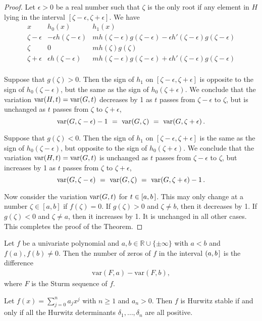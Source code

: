 \begin{proof}
 Let $\epsilon>0$ be a real number such that $\zeta$ is the only root if any element in $H$ lying in the interval
 $[\zeta-\epsilon,\zeta+\epsilon]$.
 We have
 \[
 \begin{array}{c|c|l}
   x & h_0(x) & h_1(x)\\\hline
   \zeta-\epsilon & -\epsilon h(\zeta-\epsilon)  & mh(\zeta-\epsilon)g(\zeta-\epsilon) - \epsilon h'(\zeta-\epsilon)g(\zeta-\epsilon)\\
   \zeta     &     0    &   mh(\zeta)g(\zeta)\\
   \zeta+\epsilon & \epsilon h(\zeta-\epsilon)  & mh(\zeta-\epsilon)g(\zeta-\epsilon) + \epsilon h'(\zeta-\epsilon)g(\zeta-\epsilon)\\
 \end{array}
 \]

 Suppose that $g(\zeta)>0$.
 Then the sign of $h_1$ on $[\zeta-\epsilon,\zeta+\epsilon]$ is opposite to the sign of $h_0(\zeta-\epsilon)$, but the same as the sign of
 $h_0(\zeta+\epsilon)$.
 We conclude that the variation $\operatorname{{\rm var}}(H,t)=\operatorname{{\rm var}}(G,t)$ decreases by 1 as $t$ passes from $\zeta-\epsilon$ to $\zeta$, but is unchanged as $t$
 passes from $\zeta$ to $\zeta+\epsilon$,
 \[
 \var(G,\zeta-\epsilon)-1\ =\ \var(G,\zeta)\ =\ \var(G,\zeta+\epsilon)\,.
 \]
  

 Suppose that $g(\zeta)<0$.
 Then the sign of $h_1$ on $[\zeta-\epsilon,\zeta+\epsilon]$ is the same as the sign of $h_0(\zeta-\epsilon)$, but opposite to the sign of
 $h_0(\zeta+\epsilon)$.
 We conclude that the variation $\operatorname{{\rm var}}(H,t)=\operatorname{{\rm var}}(G,t)$ is unchanged as $t$ passes from $\zeta-\epsilon$ to $\zeta$, but increases by 1 as $t$ 
 passes from $\zeta$ to $\zeta+\epsilon$,
 \[
   \var(G,\zeta-\epsilon)\ =\ \var(G,\zeta)\ =\ \var(G,\zeta+\epsilon)-1\,.
 \]

 Now consider the variation $\operatorname{{\rm var}}(G,t)$ for $t\in[a,b\hspace{.05cm}]$.
 This may only change at a number $\zeta\in[a,b]$ if $f(\zeta)=0$.
 If $g(\zeta)>0$ and $\zeta\neq b$, then it decreases by 1.
 If $g(\zeta)<0$ and $\zeta\neq a$, then it increases by 1.
 It is unchanged in all other cases.
 This completes the proof of the Theorem.  
 \end{proof}


Let $f$ be a univariate polynomial and $a,b\in \mathbb{R}\cup\{\pm\infty\}$ with $a<b$ and $f(a),f(b)\neq 0$. Then the number of zeros of $f$ in the interval $(a,b\hspace{.05cm}]$ is the difference 
\begin{align*}
\text{var}(F,a) - \text{var}(F,b),
\end{align*}
where $F$ is the Sturm sequence of $f$.



\theorem
Let $f(x) = \sum_{j=0}^{n}a_{j}x^{j}$ with $n\geq 1$ and $a_{n}>0$. Then $f$ is Hurwitz stable if and only if all the Hurwitz determinants $\delta_{1},\dots,\delta_{n}$ are all positive.
%
%
